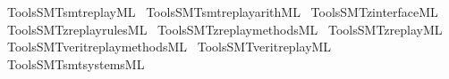 \begin{isabellebody}
\isamarkupfalse%
\ {\isacartoucheopen}Tools{\isacharslash}{\kern0pt}SMT{\isacharslash}{\kern0pt}smt{\isacharunderscore}{\kern0pt}replay{\isachardot}{\kern0pt}ML{\isacartoucheclose}\isanewline
{}\isamarkupfalse%
\ {\isacartoucheopen}Tools{\isacharslash}{\kern0pt}SMT{\isacharslash}{\kern0pt}smt{\isacharunderscore}{\kern0pt}replay{\isacharunderscore}{\kern0pt}arith{\isachardot}{\kern0pt}ML{\isacartoucheclose}\isanewline
{}\isamarkupfalse%
\ {\isacartoucheopen}Tools{\isacharslash}{\kern0pt}SMT{\isacharslash}{\kern0pt}z{}{\isacharunderscore}{\kern0pt}interface{\isachardot}{\kern0pt}ML{\isacartoucheclose}\isanewline
{}\isamarkupfalse%
\ {\isacartoucheopen}Tools{\isacharslash}{\kern0pt}SMT{\isacharslash}{\kern0pt}z{}{\isacharunderscore}{\kern0pt}replay{\isacharunderscore}{\kern0pt}rules{\isachardot}{\kern0pt}ML{\isacartoucheclose}\isanewline
{}\isamarkupfalse%
\ {\isacartoucheopen}Tools{\isacharslash}{\kern0pt}SMT{\isacharslash}{\kern0pt}z{}{\isacharunderscore}{\kern0pt}replay{\isacharunderscore}{\kern0pt}methods{\isachardot}{\kern0pt}ML{\isacartoucheclose}\isanewline
{}\isamarkupfalse%
\ {\isacartoucheopen}Tools{\isacharslash}{\kern0pt}SMT{\isacharslash}{\kern0pt}z{}{\isacharunderscore}{\kern0pt}replay{\isachardot}{\kern0pt}ML{\isacartoucheclose}\isanewline
{}\isamarkupfalse%
\ {\isacartoucheopen}Tools{\isacharslash}{\kern0pt}SMT{\isacharslash}{\kern0pt}verit{\isacharunderscore}{\kern0pt}replay{\isacharunderscore}{\kern0pt}methods{\isachardot}{\kern0pt}ML{\isacartoucheclose}\isanewline
{}\isamarkupfalse%
\ {\isacartoucheopen}Tools{\isacharslash}{\kern0pt}SMT{\isacharslash}{\kern0pt}verit{\isacharunderscore}{\kern0pt}replay{\isachardot}{\kern0pt}ML{\isacartoucheclose}\isanewline
{}\isamarkupfalse%
\ {\isacartoucheopen}Tools{\isacharslash}{\kern0pt}SMT{\isacharslash}{\kern0pt}smt{\isacharunderscore}{\kern0pt}systems{\isachardot}{\kern0pt}ML{\isacartoucheclose}%
\endisatagML
{\isafoldML}%
%
\isadelimML
%
\endisadelimML
%
\isadelimdocument
%
\endisadelimdocument
%
\isatagdocument
%
\isamarkuptrue%
%
\endisatagdocument
{\isafolddocument}%
%
\isadelimdocument
%
\endisadelimdocument

\end{isabellebody}
